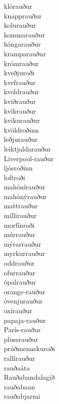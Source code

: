 \documentclass[../samsetningasafn.tex]{subfiles}
\begin{document}
\begin{bigwordlist}
\begin{footnotesize}
\begin{multicols}{4}
\begin{description}
		\item [klórauður]
		\item [knapprauður]
		\item [kolurauður]
		\item [kommarauður]
		\item [kóngarauður]
		\item [kramparauður]
		\item [krómrauður]
		\item [kveðjuroði]
		\item [kvefrauður]
		\item [kveldrauður]
		\item [kviðrauður]
		\item [kvikrauður]
		\item [kvikurauður]
		\item [kvöldroðinn]
		\item [leðjurauður]
		\item [leiktjaldarauður]
		\item [Liverpool-rauður]
		\item [ljósroðinn]
		\item [loftroði]
		\item [mahónírauður]
		\item [mahónýrauður]
		\item [mattrauður]
		\item [millirauður]
		\item [morfínroði]
		\item [múrrauður]
		\item [mýrarrauður]
		\item [myrkurrauður]
		\item [oddrauður]
		\item [ofurrauður]
		\item [ópalrauður]
		\item [orange-rauður]
		\item [óvenjurauður]
		\item [oxírauður]
		\item [papaja-rauður]
		\item [París-rauður]
		\item [plussrauður]
		\item [prúðmennskuroði]
		\item [rallírauður]
		\item [rauðaáta]
		\item [Rauðabandalagið]
		\item [rauðabaun]
		\item [rauðabjarmi]

\end{description}
\end{multicols}
\end{footnotesize}
\end{bigwordlist}
\end{document}
